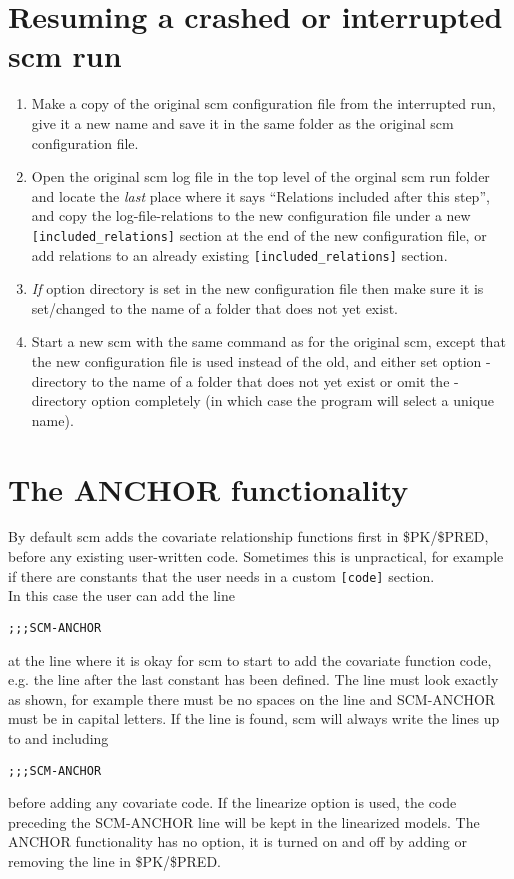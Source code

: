 \section{Resuming a crashed or interrupted scm run}
\begin{enumerate}
\item Make a copy of the original scm configuration file from the interrupted run, give it a new name and save it in the same folder as the original scm configuration file.
\item Open the original scm log file in the top level of the orginal scm run folder and locate the \emph{last} place where it says “Relations included after this step”, and copy the log-file-relations to the new configuration file under a new \verb|[included_relations]| section at the end of the new configuration file, or add relations to an already existing \verb|[included_relations]| section. 
\item \emph{If} option directory is set in the new configuration file then make sure it is set/changed to the name of a folder that does not yet exist.
\item Start a new scm with the same command as for the original scm, except that the new configuration file is used instead of the old, and either set option -directory to the name of a folder that does not yet exist or omit the -directory option completely (in which case the program will select a unique name). 
\end{enumerate}
\section{The ANCHOR functionality}
By default scm adds the covariate relationship functions first in \$PK/\$PRED, before any existing user-written code. Sometimes this is unpractical, for example if there are constants that the user needs in a custom \verb|[code]| section.\\
In this case the user can add the line
\begin{verbatim}
;;;SCM-ANCHOR
\end{verbatim}
at the line where it is okay for scm to start to add the covariate function code, e.g. the line after the last constant has been defined. The line must look exactly as shown, for example there must be no spaces on the line and SCM-ANCHOR must be in capital letters. If the line is found, scm will always write the lines up to and including 
\begin{verbatim}
;;;SCM-ANCHOR
\end{verbatim}
before adding any covariate code. If the linearize option is used, the code preceding the SCM-ANCHOR line will be kept in the linearized models. The ANCHOR functionality has no option, it is turned on and off by adding or removing the line in \$PK/\$PRED.

